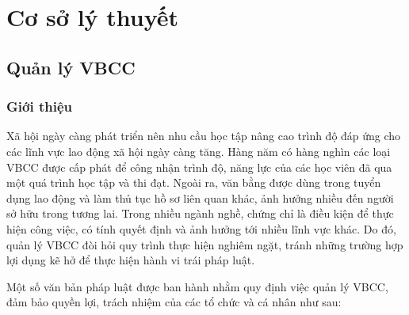 \chapter{Cơ sở lý thuyết}
\section{Quản lý VBCC}
\subsection{Giới thiệu}

Xã hội ngày càng phát triển nên nhu cầu học tập nâng cao trình độ đáp ứng cho các lĩnh vực lao động xã hội ngày càng tăng.
Hàng năm có hàng nghìn các loại VBCC được cấp phát để công nhận trình độ, năng lực của các học viên đã qua một quá trình học tập và thi đạt.
Ngoài ra, văn bằng được dùng trong tuyển dụng lao động và làm thủ tục hồ sơ liên quan khác, ảnh hưởng nhiều đến người sở hữu trong tương lai.
Trong nhiều ngành nghề, chứng chỉ là điều kiện để thực hiện công việc, có tính quyết định và ảnh hưởng tới nhiều lĩnh vực khác.
Do đó, quản lý VBCC đòi hỏi quy trình thực hiện nghiêm ngặt, tránh những trường hợp lợi dụng kẽ hở để thực hiện hành vi trái pháp luật.

Một số văn bản pháp luật được ban hành nhằm quy định việc quản lý VBCC, đảm bảo quyền lợi, trách nhiệm của các tổ chức và cá nhân như sau:

